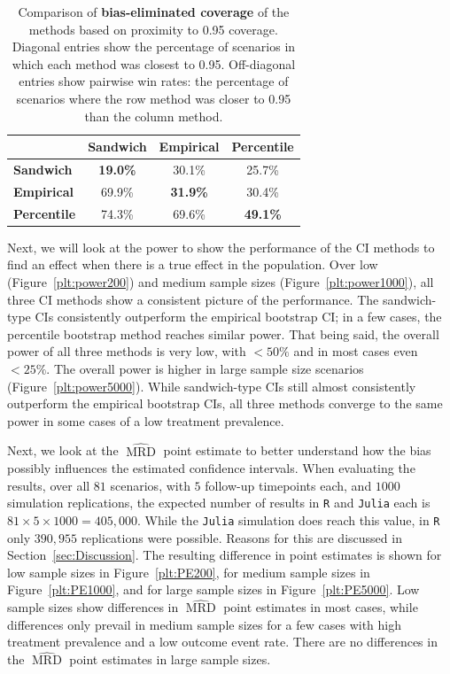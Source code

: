 \documentclass[pdflatex,sn-vancouver-ay]{sn-jnl}%
\theoremstyle{thmstyleone}%
\theoremstyle{thmstyletwo}%
\theoremstyle{thmstylethree}%
\newcommand{\Rlang}{\texttt{R}}
\newcommand{\julia}{\texttt{Julia}}
\begin{document}
\begin{table}[h!]
\centering
\begin{tabular}{lccc}
\hline
\textbf{} & \textbf{Sandwich} & \textbf{Empirical} & \textbf{Percentile} \\
\hline
\textbf{Sandwich}   & \textbf{19.0\%} & 30.1\% & 25.7\% \\
\textbf{Empirical}  & 69.9\%          & \textbf{31.9\%} & 30.4\% \\
\textbf{Percentile} & 74.3\%          & 69.6\% & \textbf{49.1\%} \\
\hline
\end{tabular}
\caption{Comparison of \textbf{bias-eliminated coverage} of the methods based on proximity to 0.95 coverage. Diagonal entries show the percentage of scenarios in which each method was closest to 0.95. Off-diagonal entries show pairwise win rates: the percentage of scenarios where the row method was closer to 0.95 than the column method.}
\label{tab:bias_coverage_comparison}
\end{table}

Next, we will look at the power to show the performance of the CI methods to find an effect when there is a true effect in the population. Over low (Figure~\ref{plt:power200}) and medium sample sizes (Figure~\ref{plt:power1000}), all three CI methods show a consistent picture of the performance. The sandwich-type CIs consistently outperform the empirical bootstrap CI; in a few cases, the percentile bootstrap method reaches similar power. That being said, the overall power of all three methods is very low, with $<50\%$ and in most cases even $<25\%$. The overall power is higher in large sample size scenarios (Figure~\ref{plt:power5000}). While sandwich-type CIs still almost consistently outperform the empirical bootstrap CIs, all three methods converge to the same power in some cases of a low treatment prevalence.

Next, we look at the $\widehat{\operatorname{MRD}}$ point estimate to better understand how the bias possibly influences the estimated confidence intervals. When evaluating the results, over all $81$ scenarios, with $5$ follow-up timepoints each, and $1000$ simulation replications, the expected number of results in \Rlang{} and \julia{} each is $81 \times 5 \times 1000 = 405,000$. While the \julia{} simulation does reach this value, in \Rlang{} only $390,955$ replications were possible. Reasons for this are discussed in Section~\ref{sec:Discussion}. The resulting difference in point estimates is shown for low sample sizes in Figure~\ref{plt:PE200}, for medium sample sizes in Figure~\ref{plt:PE1000}, and for large sample sizes in Figure~\ref{plt:PE5000}. Low sample sizes show differences in $\widehat{\operatorname{MRD}}$ point estimates in most cases, while differences only prevail in medium sample sizes for a few cases with high treatment prevalence and a low outcome event rate. There are no differences in the $\widehat{\operatorname{MRD}}$ point estimates in large sample sizes.
\end{document}
